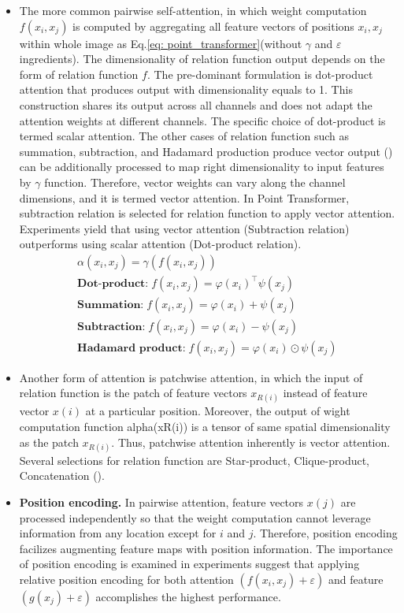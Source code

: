 \begin{itemize}
	\item The more common pairwise self-attention, in which weight computation $f(x_i,x_j)$ is computed by aggregating all feature vectors of positions $x_i, x_j$ within whole image as Eq.\ref{eq: point_transformer}(without $\gamma$ and $\varepsilon$ ingredients). The dimensionality of relation function output depends on the form of relation function $f$. The pre-dominant formulation is dot-product attention that produces output with dimensionality equals to 1. This construction shares its output across all channels and does not adapt the attention weights at different channels. The specific choice of dot-product is termed scalar attention. The other cases of relation function such as summation, subtraction, and Hadamard production produce vector output (\textcolor{cyan}{\cite{zhao2020exploring}}) can be additionally processed to map right dimensionality to input features by $\gamma$ function. Therefore, vector weights can vary along the channel dimensions, and it is termed vector attention. In Point Transformer, subtraction relation is selected for relation function to apply vector attention. Experiments yield that using vector attention (Subtraction relation) outperforms using scalar attention (Dot-product relation). 
\begin{align}
\alpha(x_i,x_j)=\gamma(f(x_i, x_j))													\\
\textbf{Dot-product:} \; f(x_i, x_j) = \varphi(x_i)^{\top} \psi(x_j) 			\\
\textbf{Summation:} \; f(x_i,x_j) = \varphi(x_i) + \psi(x_j) 				\\
\textbf{Subtraction:} \; f(x_i,x_j) = \varphi(x_i) - \psi(x_j) 				\\
\textbf{Hadamard product:} \; f(x_i,x_j) = \varphi(x_i) \odot \psi(x_j) 			\
\end{align}
	\item Another form of attention is patchwise attention, in which the input of relation function is the patch of feature vectors $x_{R(i)}$ instead of feature vector $x(i)$ at a particular position. Moreover, the output of wight computation function alpha(xR(i)) is a tensor of same spatial dimensionality as the patch $x_{R(i)}$. Thus, patchwise attention inherently is vector attention. Several selections for relation function are Star-product, Clique-product, Concatenation (\textcolor{cyan}{\cite{zhao2020exploring}}).
	\item \textbf{Position encoding.} In pairwise attention, feature vectors $x(j)$ are processed independently so that the weight computation cannot leverage information from any location except for $i$ and $j$. Therefore, position encoding facilizes augmenting feature maps with position information. The importance of position encoding is examined in experiments suggest that applying relative position encoding for both attention $(f(x_i,x_j) + \varepsilon)$ and feature $(g(x_j)+\varepsilon)$ accomplishes the highest performance.
\end{itemize}
